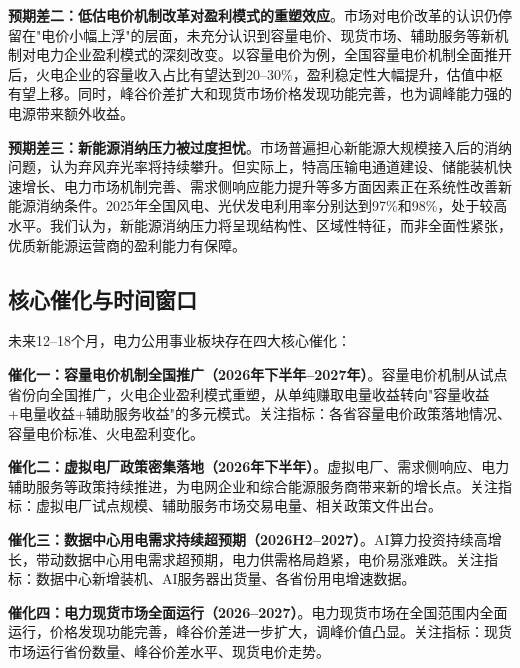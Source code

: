 \vspace{0.3em}

\textbf{预期差二：低估电价机制改革对盈利模式的重塑效应}。市场对电价改革的认识仍停留在"电价小幅上浮"的层面，未充分认识到容量电价、现货市场、辅助服务等新机制对电力企业盈利模式的深刻改变。以容量电价为例，全国容量电价机制全面推开后，火电企业的容量收入占比有望达到20--30\%，盈利稳定性大幅提升，估值中枢有望上移。同时，峰谷价差扩大和现货市场价格发现功能完善，也为调峰能力强的电源带来额外收益。

\vspace{0.3em}

\textbf{预期差三：新能源消纳压力被过度担忧}。市场普遍担心新能源大规模接入后的消纳问题，认为弃风弃光率将持续攀升。但实际上，特高压输电通道建设、储能装机快速增长、电力市场机制完善、需求侧响应能力提升等多方面因素正在系统性改善新能源消纳条件。2025年全国风电、光伏发电利用率分别达到97\%和98\%，处于较高水平。我们认为，新能源消纳压力将呈现结构性、区域性特征，而非全面性紧张，优质新能源运营商的盈利能力有保障。

\subsection{核心催化与时间窗口}

未来12--18个月，电力公用事业板块存在四大核心催化：

\vspace{0.3em}

\textbf{催化一：容量电价机制全国推广（2026年下半年--2027年）}。容量电价机制从试点省份向全国推广，火电企业盈利模式重塑，从单纯赚取电量收益转向"容量收益+电量收益+辅助服务收益"的多元模式。关注指标：各省容量电价政策落地情况、容量电价标准、火电盈利变化。

\vspace{0.3em}

\textbf{催化二：虚拟电厂政策密集落地（2026年下半年）}。虚拟电厂、需求侧响应、电力辅助服务等政策持续推进，为电网企业和综合能源服务商带来新的增长点。关注指标：虚拟电厂试点规模、辅助服务市场交易电量、相关政策文件出台。

\vspace{0.3em}

\textbf{催化三：数据中心用电需求持续超预期（2026H2--2027）}。AI算力投资持续高增长，带动数据中心用电需求超预期，电力供需格局趋紧，电价易涨难跌。关注指标：数据中心新增装机、AI服务器出货量、各省份用电增速数据。

\vspace{0.3em}

\textbf{催化四：电力现货市场全面运行（2026--2027）}。电力现货市场在全国范围内全面运行，价格发现功能完善，峰谷价差进一步扩大，调峰价值凸显。关注指标：现货市场运行省份数量、峰谷价差水平、现货电价走势。

